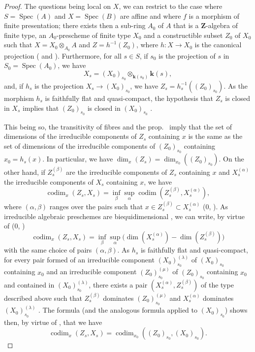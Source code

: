 \begin{proof}
\label{IV.9.9.1-proof}
The questions being local on $X$, we can restrict to the case where $S=\operatorname{Spec}(A)$ and $X=\operatorname{Spec}(B)$ are affine and where $f$ is a morphism of finite presentation; there exists then a sub-ring $A_0$ of $A$ that is a $\mathbf{Z}$-algebra of finite type, an $A_0$-prescheme of finite type $X_0$ and a constructible subset $Z_0$ of $X_0$ such that $X=X_0\otimes_{A_0}A$ and $Z=h^{-1}(Z_0)$, where $h:X\to X_0$ is the canonical projection ( and ).
Furthermore, for all $s\in S$, if $s_0$ is the projection of $s$ in $S_0=\operatorname{Spec}(A_0)$, we have
\[
  X_s=(X_0)_{s_0}\otimes_{\mathbf{k}(s_0)}\mathbf{k}(s),
\]
and, if $h_s$ is the projection $X_s\to(X_0)_{s_0}$, we have $Z_s=h_s^{-1}((Z_0)_{s_0})$.
As the morphism $h_s$ is faithfully flat and quasi-compact, the hypothesis that $Z_s$ is closed in $X_s$ implies that $(Z_0)_{s_0}$ is closed in $(X_0)_{s_0}$ .

This being so, the transitivity of fibres  and the prop.~ imply that the set of dimensions of the irreducible components of $Z_s$ containing $x$ is the same as the set of dimensions of the irreducible components of $(Z_0)_{s_0}$ containing $x_0=h_s(x)$.
In particular, we have $\dim_x(Z_s)=\dim_{x_0}((Z_0)_{s_0})$.
On the other hand, if $Z_s^{(\beta)}$ are the irreducible components of $Z_s$ containing $x$ and $X_s^{(\alpha)}$ the irreducible components of $X_s$
containing $x$, we have
\[
  \operatorname{codim}_x(Z_s,X_s)
  =\inf_{\beta}\sup_{\alpha}\operatorname{codim}(Z_s^{(\beta)},X_s^{(\alpha)}),
\]
where $(\alpha,\beta)$ ranges over the pairs such that $x\in Z_s^{(\beta)}\subset X_s^{(\alpha)}$ ($0$, ).
As irreducible algebraic preschemes are biequidimensional , we can write, by virtue of ($0$, )
\begin{equation}
\tag{9.9.1.1}
\label{IV.9.9.1.1}
  \operatorname{codim}_x(Z_s,X_s)=\inf_{\beta}\sup_{\alpha}\bigl(\dim(X_s^{(\alpha)})-\dim(Z_s^{(\beta)})\bigr)
\end{equation}
with the same choice of pairs $(\alpha,\beta)$.
As $h_s$ is faithfully flat and quasi-compact, for every pair formed of an irreducible component $(X_0)_{s_0}^{(\lambda)}$ of $(X_0)_{s_0}$ containing $x_0$ and an irreducible component $(Z_0)_{s_0}^{(\mu)}$ of $(Z_0)_{s_0}$ containing $x_0$ and contained in $(X_0)_{s_0}^{(\lambda)}$, there exists a pair $(X_s^{(\alpha)},Z_s^{(\beta)})$ of the type described above such that $Z_s^{(\beta)}$ dominates $(Z_0)_{s_0}^{(\mu)}$ and $X_s^{(\alpha)}$ dominates $(X_0)_{s_0}^{(\lambda)}$ .
The formula  (and the analogous formula applied to $(X_0)_{s_0}$) shows then, by virtue of , that we have
\[
  \operatorname{codim}_x(Z_s,X_s)=\operatorname{codim}_{x_0}((Z_0)_{s_0},(X_0)_{s_0}).
\]


\end{proof}
